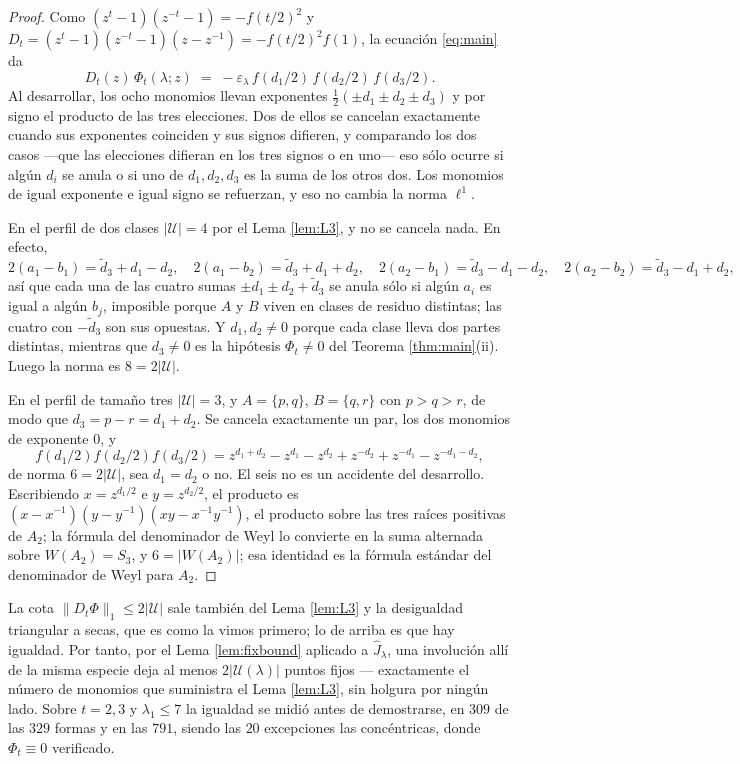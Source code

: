 \documentclass[11pt,reqno]{amsart}
\newcommand{\stverif}{\textcolor{hverif}{\small verificado}}
\theoremstyle{plain}
\theoremstyle{definition}
\begin{document}
\begin{proof}
Como $(z^t-1)(z^{-t}-1)=-f(t/2)^2$ y $D_t=(z^t-1)(z^{-t}-1)(z-z^{-1})=-f(t/2)^2f(1)$, la ecuación
\eqref{eq:main} da
\[
D_t(z)\,\Phi_t(\lambda;z)\;=\;-\varepsilon_\lambda\,f(d_1/2)\,f(d_2/2)\,f(d_3/2).
\]
Al desarrollar, los ocho monomios llevan exponentes $\tfrac12(\pm d_1\pm d_2\pm d_3)$ y por signo el
producto de las tres elecciones. Dos de ellos se cancelan exactamente cuando sus exponentes coinciden
y sus signos difieren, y comparando los dos casos ---que las elecciones difieran en los tres signos o
en uno--- eso sólo ocurre si algún $d_i$ se anula o si uno de $d_1,d_2,d_3$ es la suma de los otros
dos. Los monomios de igual exponente e igual signo se refuerzan, y eso no cambia la norma $\ell^1$.

En el perfil de dos clases $|\mathcal U|=4$ por el Lema \ref{lem:L3}, y no se cancela nada. En
efecto,
\[
2(a_1-b_1)=\tilde d_3+d_1-d_2,\quad
2(a_1-b_2)=\tilde d_3+d_1+d_2,\quad
2(a_2-b_1)=\tilde d_3-d_1-d_2,\quad
2(a_2-b_2)=\tilde d_3-d_1+d_2,
\]
así que cada una de las cuatro sumas $\pm d_1\pm d_2+\tilde d_3$ se anula sólo si algún $a_i$ es
igual a algún $b_j$, imposible porque $A$ y $B$ viven en clases de residuo distintas; las cuatro con
$-\tilde d_3$ son sus opuestas. Y $d_1,d_2\ne0$ porque cada clase lleva dos partes distintas,
mientras que $d_3\ne0$ es la hipótesis $\Phi_t\ne0$ del Teorema \ref{thm:main}(ii). Luego la norma
es $8=2|\mathcal U|$.

En el perfil de tamaño tres $|\mathcal U|=3$, y $A=\{p,q\}$, $B=\{q,r\}$ con $p>q>r$, de modo que
$d_3=p-r=d_1+d_2$. Se cancela exactamente un par, los dos monomios de exponente $0$, y
\[
f(d_1/2)f(d_2/2)f(d_3/2)=z^{d_1+d_2}-z^{d_1}-z^{d_2}+z^{-d_2}+z^{-d_1}-z^{-d_1-d_2},
\]
de norma $6=2|\mathcal U|$, sea $d_1=d_2$ o no. El seis no es un accidente del desarrollo. Escribiendo
$x=z^{d_1/2}$ e $y=z^{d_2/2}$, el producto es $(x-x^{-1})(y-y^{-1})(xy-x^{-1}y^{-1})$, el producto
sobre las tres raíces positivas de $A_2$; la fórmula del denominador de Weyl lo convierte en la suma
alternada sobre $W(A_2)=S_3$, y $6=|W(A_2)|$; esa identidad es la fórmula estándar del
denominador de Weyl para $A_2$.
\end{proof}

La cota $\|D_t\Phi\|_1\le2|\mathcal U|$ sale también del Lema \ref{lem:L3} y la desigualdad
triangular a secas, que es como la vimos primero; lo de arriba es que hay igualdad. Por tanto, por el
Lema \ref{lem:fixbound} aplicado a $\widehat J_\lambda$, una involución allí de la misma especie
deja al menos $2|\mathcal U(\lambda)|$ puntos fijos --- exactamente el número de monomios que
suministra el Lema \ref{lem:L3}, sin holgura por ningún lado. Sobre $t=2,3$ y $\lambda_1\le7$ la
igualdad se midió antes de demostrarse, en $309$ de las $329$ formas y en las $791$, siendo las $20$
excepciones las concéntricas, donde $\Phi_t\equiv0$ \stverif.
\end{document}
